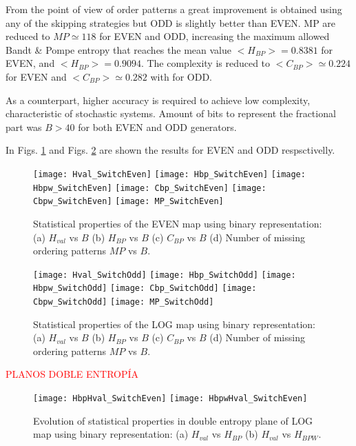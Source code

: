 From the point of view of order patterns a great improvement is obtained using any of the skipping strategies but ODD is slightly better than EVEN.
MP are reduced to $MP\simeq 118$ for EVEN and  ODD, increasing the maximum allowed Bandt \& Pompe entropy that reaches the mean value $<H_{BP}> = 0.8381$ for EVEN, and $<H_{BP}> = 0.9094$.
The complexity is reduced to $<C_{BP}>\simeq 0.224$ for EVEN and  $<C_{BP}>\simeq 0.282$ with for ODD.

As a counterpart, higher accuracy is required to achieve low complexity, characteristic of stochastic systems.
Amount of bits to represent the fractional part was $B>40$ for both EVEN and ODD generators.

In Figs. \ref{fig:EVEN_QuantiB} and Figs. \ref{fig:ODD_QuantiB} are shown the results for EVEN and ODD respsctivelly.

\begin{figure}
	\texttt{[image: Hval\_SwitchEven]}
	\texttt{[image: Hbp\_SwitchEven]}
	\texttt{[image: Hbpw\_SwitchEven]}
	\texttt{[image: Cbp\_SwitchEven]}
	\texttt{[image: Cbpw\_SwitchEven]}
	\texttt{[image: MP\_SwitchEven]}
	\caption{Statistical properties of the EVEN map using binary representation: (a) $H_{val}$ vs $B$ (b) $H_{BP}$ vs $B$ (c) $C_{BP}$ vs $B$ (d) Number of missing ordering patterns $MP$ vs $B$.}
	\label{fig:EVEN_QuantiB}
\end{figure}

\begin{figure}
	\texttt{[image: Hval\_SwitchOdd]}
	\texttt{[image: Hbp\_SwitchOdd]}
	\texttt{[image: Hbpw\_SwitchOdd]}
	\texttt{[image: Cbp\_SwitchOdd]}
	\texttt{[image: Cbpw\_SwitchOdd]}
	\texttt{[image: MP\_SwitchOdd]}
	\caption{Statistical properties of the LOG map using binary representation: (a) $H_{val}$ vs $B$ (b) $H_{BP}$ vs $B$ (c) $C_{BP}$ vs $B$ (d) Number of missing ordering patterns $MP$ vs $B$.}
	\label{fig:ODD_QuantiB}
	\end{figure}

\textcolor{red}{PLANOS DOBLE ENTROPÍA}

\begin{figure}
	\texttt{[image: HbpHval\_SwitchEven]}
	\texttt{[image: HbpwHval\_SwitchEven]}
	\caption{Evolution of statistical properties in double entropy plane of LOG map using binary representation: (a) $H_{val}$ vs $H_{BP}$ (b) $H_{val}$ vs $H_{BPW}$.}
	\label{fig:EVEN_HH}
\end{figure}

